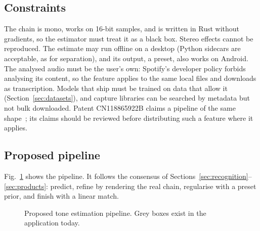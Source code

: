 \subsection{Constraints}

The chain is mono, works on 16-bit samples, and is written in Rust without
gradients, so the estimator must treat it as a black box. Stereo effects
cannot be reproduced. The estimate may run offline on a desktop (Python
sidecars are acceptable, as for separation), and its output, a preset, also
works on Android. The analysed audio must be the user's own: Spotify's
developer policy forbids analysing its content, so the feature applies to the
same local files and downloads as transcription. Models that ship must be
trained on data that allow it (Section~\ref{sec:datasets}), and capture
libraries can be searched by metadata but not bulk downloaded. Patent
CN118865922B claims a pipeline of the same shape~\cite{huanyin2025presetpatent};
its claims should be reviewed before distributing such a feature where it
applies.

\subsection{Proposed pipeline}

Fig.~\ref{fig:pipeline} shows the pipeline. It follows the consensus of
Sections~\ref{sec:recognition}--\ref{sec:products}: predict, refine by
rendering the real chain, regularise with a preset prior, and finish with a
linear match.

\begin{figure}[t]
\centering
{}
\caption{Proposed tone estimation pipeline. Grey boxes exist in the
application today.}
\label{fig:pipeline}
\end{figure}

